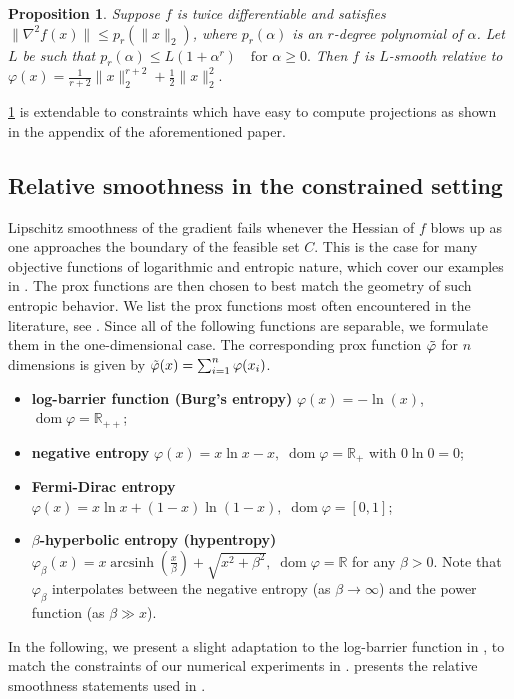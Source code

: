 \documentclass[11pt,reqno]{amsart}
\numberwithin{equation}{section}
\numberwithin{figure}{section}
\theoremstyle{plain}
\newtheorem{proposition}[theorem]{Proposition}
\theoremstyle{definition}
\newcommand{\R}{\mathbb{R}}
\newcommand{\vphi}{\varphi}
\DeclareMathOperator{\dom}{dom}
\DeclareMathOperator{\arcsinh}{arcsinh}
\begin{document}
\begin{proposition}{\cite[Proposition 2.1]{Lu2018}} \label{prop:Lu-rel-smooth-to-poly}
Suppose $f$ is twice differentiable and satisfies $\|\nabla^2 f(x)\| \allowbreak \leq p_r(\|x\|_2)$, where $p_r(\alpha)$ is an $r$-degree polynomial of $\alpha$. Let $L$ be such that
$p_r(\alpha) \leq L(1 + \alpha^r) \quad \text{for } \alpha \geq 0.$ Then $f$ is $L$-smooth relative to
$ \vphi(x) = \frac{1}{r+2} \|x\|_2^{r+2} + \frac{1}{2} \|x\|_2^2.$
\end{proposition} 
\cref{prop:Lu-rel-smooth-to-poly} is extendable to constraints which have easy to compute projections as shown in the appendix of the aforementioned paper.

\subsection{Relative smoothness in the constrained setting} Lipschitz smoothness of the gradient fails whenever the Hessian of $f$ blows up as one approaches the boundary of the feasible set $C$. This is the case for many objective functions of logarithmic and entropic nature, which cover our examples in . The prox functions are then chosen to best match the geometry of such entropic behavior.
We list the prox functions most often encountered in the literature, see \cite{Bauschke:2017aa,Lu2018,Bauschke:19,Hypentropy2020,AubinFrankowski2022}. Since all of the following functions are separable, we formulate them in the one-dimensional case. The corresponding prox function $\Tilde{\vphi}$ for $n$ dimensions is given by $\Tilde{\vphi}(x) = \sum_{i = 1}^n \vphi(x_i)$.
\begin{itemize}
    \item \textbf{log-barrier function (Burg's entropy)} \; $\vphi(x) = -\ln(x)$, \; $\dom \vphi = \R_{++}$;
    \item \textbf{negative entropy} \; $\vphi(x) = x \ln x - x, \; \dom \vphi = \R_+$ with $0 \ln 0 = 0$;
    \item \textbf{Fermi-Dirac entropy} \; $\vphi(x) = x \ln x + (1-x) \ln(1-x), \; \dom \vphi = [0,1]$;
    \item \textbf{$\beta$-hyperbolic entropy (hypentropy)} \; $\vphi_\beta(x) = x \arcsinh \left( \frac{x}{\beta} \right) + \sqrt{x^2 + \beta^2}, \; \dom \vphi = \R$ for any $\beta > 0$.
    Note that $\vphi_\beta$ interpolates between the negative entropy (as $\beta \to \infty$) and the power function (as $\beta \gg x$).
\end{itemize}
In the following, we present a slight adaptation to the log-barrier function in , to match the constraints of our numerical experiments in .  presents the relative smoothness statements used in .
\end{document}
